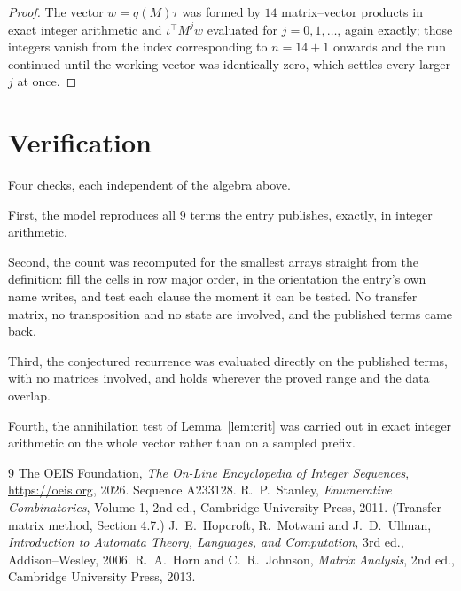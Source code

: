 \documentclass[11pt,a4paper]{article}
\theoremstyle{plain}
\theoremstyle{definition}
\begin{document}
\begin{proof}
The vector $w=q(M)\tau$ was formed by $14$ matrix--vector products in exact integer
arithmetic and $\iota^{\!\top}M^{j}w$ evaluated for $j=0,1,\dots$, again exactly; those
integers vanish from the index corresponding to $n=14+1$ onwards and the run continued
until the working vector was identically zero, which settles every larger $j$ at once.
\end{proof}

\section{Verification}

Four checks, each independent of the algebra above.

First, the model reproduces all $9$ terms the entry publishes, exactly, in integer
arithmetic.

Second, the count was recomputed for the smallest arrays straight from the definition: fill the
cells in row major order, in the orientation the entry's own name writes, and test each clause
the moment it can be tested. No transfer matrix, no transposition and no state are involved,
and the published terms came back.

Third, the conjectured recurrence was evaluated directly on the published terms, with no
matrices involved, and holds wherever the proved range and the data overlap.

Fourth, the annihilation test of Lemma~\ref{lem:crit} was carried out in exact integer
arithmetic on the whole vector rather than on a sampled prefix.

\begin{thebibliography}{9}
 The OEIS Foundation, \emph{The On-Line Encyclopedia of Integer
Sequences}, \url{https://oeis.org}, 2026. Sequence A233128.
 R.~P.~Stanley, \emph{Enumerative Combinatorics}, Volume 1, 2nd ed.,
Cambridge University Press, 2011. (Transfer-matrix method, Section 4.7.)
 J.~E.~Hopcroft, R.~Motwani and J.~D.~Ullman, \emph{Introduction to Automata
Theory, Languages, and Computation}, 3rd ed., Addison--Wesley, 2006.
 R.~A.~Horn and C.~R.~Johnson, \emph{Matrix Analysis}, 2nd ed., Cambridge
University Press, 2013.
\end{thebibliography}
\end{document}
